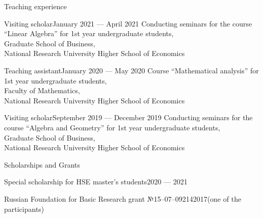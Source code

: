 \documentclass{resume}
\begin{document}
\begin{rSection}{Teaching experience}
  \begin{rSubsection}{Visiting scholar}{January 2021 --- April 2021}{}
    Conducting seminars for the course ``Linear Algebra'' for 1st year undergraduate students, \\
    Graduate School of Business, \\
    National Research University Higher School of Economics
  \end{rSubsection}

  \begin{rSubsection}{Teaching assistant}{January 2020 --- May 2020}{}
    Course ``Mathematical analysis'' for 1st year undergraduate students, \\
    Faculty of Mathematics, \\
    National Research University Higher School of Economics
  \end{rSubsection}

  \begin{rSubsection}{Visiting scholar}{September 2019 --- December 2019}{}
    Conducting seminars for the course ``Algebra and Geometry'' for 1st year undergraduate students, \\
    Graduate School of Business, \\
    National Research University Higher School of Economics
  \end{rSubsection}
\end{rSection}

\begin{rSection}{Scholarships and Grants}
  \begin{rSubsection}{Special scholarship for HSE master's students}{2020 --- 2021}{}
  \end{rSubsection}

  \begin{rSubsection}{Russian Foundation for Basic Research grant №15--07--09214}{2017}{(one of the participants)}
  \end{rSubsection}
\end{rSection}
\end{document}
